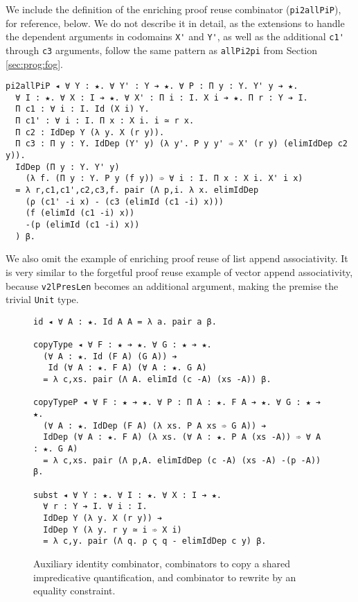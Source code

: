 \documentclass[acmsmall]{acmart}\settopmatter{}
\newcommand{\refsec}[1]{Section \ref{sec:#1}}
\newcommand{\labfig}[1]{\label{fig:#1}}
\begin{document}
We include the definition of the enriching proof reuse combinator
(\verb;pi2allPiP;), for reference, below.
We do not describe it in detail, as the extensions to handle the
dependent arguments in codomains \verb;X'; and \verb;Y';,
as well as the additional \verb;c1'; through \verb;c3;
arguments, follow the
same pattern as \verb;allPi2pi; from \refsec{prog:fog}.

\begin{verbatim}
pi2allPiP ◂ ∀ Y : ★. ∀ Y' : Y ➔ ★. ∀ P : Π y : Y. Y' y ➔ ★.
  ∀ I : ★. ∀ X : I ➔ ★. ∀ X' : Π i : I. X i ➔ ★. Π r : Y ➔ I.
  Π c1 : ∀ i : I. Id (X i) Y.
  Π c1' : ∀ i : I. Π x : X i. i ≃ r x.
  Π c2 : IdDep Y (λ y. X (r y)).
  Π c3 : Π y : Y. IdDep (Y' y) (λ y'. P y y' ➾ X' (r y) (elimIdDep c2 y)).
  IdDep (Π y : Y. Y' y) 
    (λ f. (Π y : Y. P y (f y)) ➾ ∀ i : I. Π x : X i. X' i x)
  = λ r,c1,c1',c2,c3,f. pair (Λ p,i. λ x. elimIdDep
    (ρ (c1' -i x) - (c3 (elimId (c1 -i) x)))
    (f (elimId (c1 -i) x))
    -(p (elimId (c1 -i) x))
  ) β.
\end{verbatim}

We also omit the example of enriching proof reuse of list append
associativity. It is very similar to the forgetful proof reuse example
of vector append associativity, because \verb;v2lPresLen; becomes an
additional argument, making the premise the trivial \verb;Unit; type.

\begin{figure}
\centering

\begin{verbatim}
id ◂ ∀ A : ★. Id A A = λ a. pair a β.

copyType ◂ ∀ F : ★ ➔ ★. ∀ G : ★ ➔ ★.
  (∀ A : ★. Id (F A) (G A)) ➔
   Id (∀ A : ★. F A) (∀ A : ★. G A)
  = λ c,xs. pair (Λ A. elimId (c -A) (xs -A)) β.

copyTypeP ◂ ∀ F : ★ ➔ ★. ∀ P : Π A : ★. F A ➔ ★. ∀ G : ★ ➔ ★.
  (∀ A : ★. IdDep (F A) (λ xs. P A xs ➾ G A)) ➔
  IdDep (∀ A : ★. F A) (λ xs. (∀ A : ★. P A (xs -A)) ➾ ∀ A : ★. G A)
  = λ c,xs. pair (Λ p,A. elimIdDep (c -A) (xs -A) -(p -A)) β.

subst ◂ ∀ Y : ★. ∀ I : ★. ∀ X : I ➔ ★.
  ∀ r : Y ➔ I. ∀ i : I.
  IdDep Y (λ y. X (r y)) ➔
  IdDep Y (λ y. r y ≃ i ➾ X i)
  = λ c,y. pair (Λ q. ρ ς q - elimIdDep c y) β.
\end{verbatim}

\caption{Auxiliary identity combinator, combinators to copy a shared
  impredicative quantification, and combinator to rewrite by
  an equality constraint.} 
\labfig{aux}
\end{figure}
\end{document}
